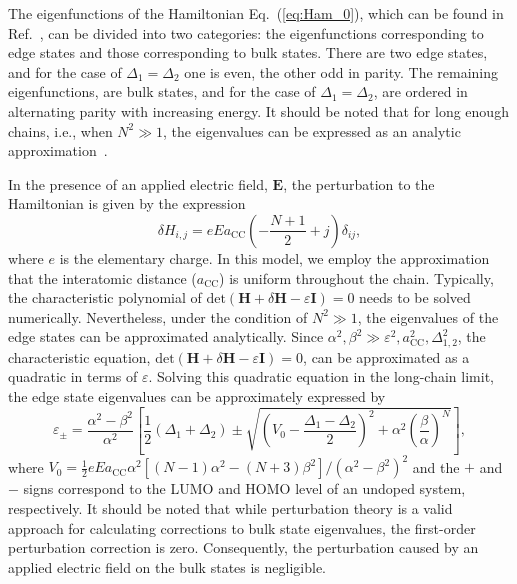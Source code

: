 \documentclass[
preprint,
 amsmath,amssymb,
 aps,
]{revtex4-2}
\begin{document}
The eigenfunctions of the Hamiltonian Eq.~(\ref{eq:Ham_0}), which can be found in Ref.~\cite{kouachi2006eigenvalues,hartmann2021terahertz}, can be divided into two categories: the eigenfunctions corresponding to edge states and those corresponding to bulk states.  There are two edge states, and for the case of $\Delta_{1}=\Delta_{2}$ one is even, the other odd in parity. The remaining eigenfunctions, are bulk states, and for the case of $\Delta_{1}=\Delta_{2}$, are ordered in alternating parity with increasing energy. It should be noted that for long enough chains, i.e., when $N^2\gg1$, %
the eigenvalues can be expressed as an analytic approximation~\cite{hartmann2021terahertz}.


In the presence of an applied electric field, $\boldsymbol{E}$, the perturbation to the Hamiltonian is given by the expression
\begin{equation}
   \delta H_{i,j} = eEa_{\mathrm{CC}}\left(-\frac{N+1}{2}+j\right) \delta_{ij},
\end{equation}
where $e$ is the elementary charge. In this model, we employ the approximation that the interatomic distance ($a_{\mathrm{CC}}$) is uniform throughout the chain. Typically, the characteristic polynomial of $\mathrm{det}\left(\textbf{H}+\delta\textbf{H}-\varepsilon\textbf{I}\right)=0$ needs to be solved numerically. Nevertheless, under the condition of $N^2\gg1$, the eigenvalues of the edge states can be approximated analytically. Since $\alpha^2,\beta^2\gg \varepsilon^2,a_{\mathrm{CC}}^2,\Delta_{1,2}^2$, the characteristic equation, $\mathrm{det}\left(\textbf{H}+\delta\textbf{H}-\varepsilon\textbf{I}\right)=0$, can be approximated as a quadratic in terms of $\varepsilon$. Solving this quadratic equation in the long-chain limit, the edge state %
eigenvalues can be approximately expressed by
\begin{equation}
    \varepsilon_{\pm}=\frac{\alpha^{2}-\beta^{2}}{\alpha^{2}}\left[\frac{1}{2}\left(\Delta_{1}+\Delta_{2}\right)\pm\sqrt{\left(V_{0}-\frac{\Delta_{1}-\Delta_{2}}{2}\right)^{2}+\alpha^{2}\left(\frac{\beta}{\alpha}\right)^{N}}\right],
\label{eq:edge_eigen}
\end{equation}
where $V_{0}=\frac{1}{2}eEa_{\mathrm{CC}}\alpha^{2}\left[\left(N-1\right)\alpha^{2}-\left(N+3\right)\beta^{2}\right]/\left(\alpha^{2}-\beta^{2}\right)^{2}$ and the $+$ and $-$ signs correspond to the LUMO and HOMO level of an undoped system, respectively. It should be noted that while perturbation theory is a valid approach for calculating corrections to bulk state eigenvalues, the first-order perturbation correction is zero. Consequently, the perturbation caused by an applied electric field on the bulk states is negligible.
\end{document}
